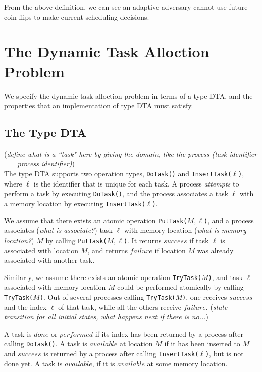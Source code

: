 From the above definition, we can see an adaptive adversary cannot use
future coin flips to make current scheduling decisions.

\section{The Dynamic Task Alloction Problem}
We specify the dynamic task alloction problem in terms of a type DTA, and the properties
that an implementation of type DTA must satisfy.

\subsection{The Type DTA}

(\emph{define what is a ``task" here by giving the domain, like the process (task identifier == process identifier)})\\

The type DTA supports two operation types, \texttt{DoTask()} and
\texttt{InsertTask(}$\ell$\texttt{)}, where $\ell$ is the identifier that is unique for each task.
A process \emph{attempts} to perform a task by executing \texttt{DoTask()}, and the process associates
a task $\ell$ with a memory location by executing \texttt{InsertTask(}$\ell$\texttt{)}.

We assume that there exists an atomic operation \texttt{PutTask(}$M,\ell$\texttt{)},
and a process associates (\emph{what is associate?}) task $\ell$ with memory location (\emph{what is memory location?}) $M$
by calling \texttt{PutTask(}$M,\ell$\texttt{)}.
It returns $success$ if task $\ell$ is associated with location $M$, and returns $failure$ if location $M$ was
already associated with another task.

Similarly, we assume there exists an atomic operation \texttt{TryTask(}$M$\texttt{)}, and
task $\ell$ associated with memory location $M$ could be performed atomically by calling \texttt{TryTask(}$M$\texttt{)}.
Out of several processes calling \texttt{TryTask(}$M$\texttt{)}, one receives $success$ and the index $\ell$ of
that task, while all the others receive $failure$. (\emph{state transition for all initial states, what happens
next if there is no...})

A task is $done$ or $performed$ if its index has been returned by a process after calling \texttt{DoTask()}.
A task is $available$ at location $M$ if it has been inserted to $M$ and $success$ is returned by a process
after calling \texttt{InsertTask(}$\ell$\texttt{)}, but is not done yet. A task is $available$, if it is $available$
at some memory location.

